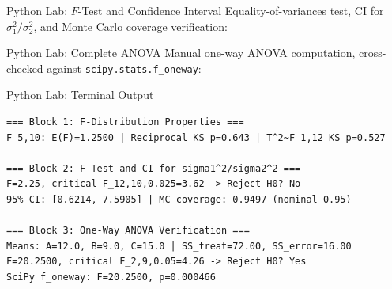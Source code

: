 \documentclass[aspectratio=169,xcolor={dvipsnames,table}]{beamer}
\begin{document}
\begin{frame}[fragile]{Python Lab: $F$-Test and Confidence Interval}
	\vspace{-0.05cm}
	\scriptsize
	Equality-of-variances test, CI for $\sigma_1^2/\sigma_2^2$, and Monte Carlo coverage verification:
	{
	}
\end{frame}

\begin{frame}[fragile]{Python Lab: Complete ANOVA}
	\vspace{-0.05cm}
	\scriptsize
	Manual one-way ANOVA computation, cross-checked against \texttt{scipy.stats.f\_oneway}:
	{
	}
\end{frame}

\begin{frame}[fragile]{Python Lab: Terminal Output}
	\vspace{-0.1cm}
	\begin{block}{}
		\fontsize{4pt}{5pt}\selectfont
		\begin{verbatim}
=== Block 1: F-Distribution Properties ===
F_5,10: E(F)=1.2500 | Reciprocal KS p=0.643 | T^2~F_1,12 KS p=0.527

=== Block 2: F-Test and CI for sigma1^2/sigma2^2 ===
F=2.25, critical F_12,10,0.025=3.62 -> Reject H0? No
95% CI: [0.6214, 7.5905] | MC coverage: 0.9497 (nominal 0.95)

=== Block 3: One-Way ANOVA Verification ===
Means: A=12.0, B=9.0, C=15.0 | SS_treat=72.00, SS_error=16.00
F=20.2500, critical F_2,9,0.05=4.26 -> Reject H0? Yes
SciPy f_oneway: F=20.2500, p=0.000466
		\end{verbatim}
	\end{block}
\end{frame}
\end{document}
